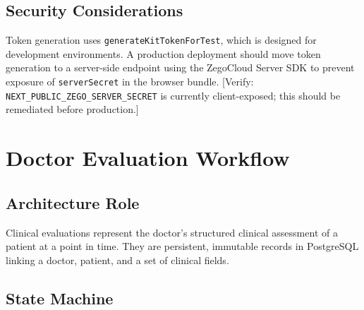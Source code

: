 \documentclass[12pt,a4paper]{report}
\begin{document}
\subsection{Security Considerations}

Token generation uses \texttt{generateKitTokenForTest}, which is
designed for development environments. A production deployment
should move token generation to a server-side endpoint using the
ZegoCloud Server SDK to prevent exposure of \texttt{serverSecret}
in the browser bundle.
[Verify: \texttt{NEXT\_PUBLIC\_ZEGO\_SERVER\_SECRET} is currently
client-exposed; this should be remediated before production.]

\section{Doctor Evaluation Workflow}
\label{sec:eval}

\subsection{Architecture Role}

Clinical evaluations represent the doctor's structured clinical
assessment of a patient at a point in time. They are persistent,
immutable records in PostgreSQL linking a doctor, patient, and a
set of clinical fields.

\subsection{State Machine}

\begin{center}
\end{center}
\end{document}
